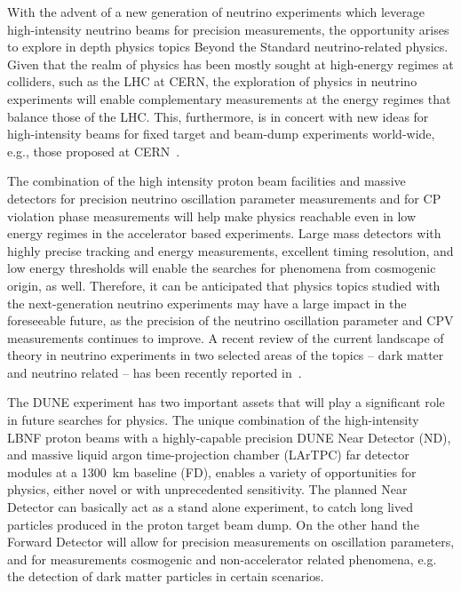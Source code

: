 
With the advent of a new generation of neutrino experiments which leverage high-intensity neutrino beams for precision measurements, 
the opportunity arises to explore in depth physics topics Beyond the Standard neutrino-related physics. 
Given that the realm of  physics  has been mostly sought at high-energy regimes at colliders, 
such as the LHC at CERN, the exploration of  physics in neutrino experiments will enable complementary 
measurements at the energy regimes that balance those  of the LHC. 
This, furthermore, is  in concert with new ideas for high-intensity beams for fixed target and beam-dump experiments 
world-wide, e.g., those proposed at CERN~\cite{Beacham:2019nyx}.

The combination of the high intensity proton beam facilities and massive detectors for precision neutrino oscillation parameter measurements and for CP violation phase measurements will help make  physics reachable even in low energy regimes in the accelerator based experiments.
Large mass detectors with highly precise tracking and energy measurements, excellent timing resolution, and low energy thresholds will enable the searches for  phenomena from cosmogenic origin, as well.
Therefore, it can be anticipated that  physics topics studied with the next-generation neutrino 
experiments may have a large impact in the foreseeable future, 
as the precision of the neutrino oscillation parameter and CPV measurements continues to improve.
A recent review of the current landscape of  theory in neutrino experiments in two selected areas of the  topics -- dark matter and neutrino related  -- has been recently reported in~\cite{Arguelles:2019xgp}.

The DUNE experiment has two important assets that will play a significant role in 
future searches for  physics.
The unique combination of the high-intensity LBNF proton beams with a highly-capable precision
 DUNE Near Detector (ND), and massive liquid argon time-projection chamber (LArTPC) far detector modules at a \SI{1300}{\km} baseline (FD), enables a variety of opportunities for  physics, either novel or with unprecedented sensitivity.
The planned Near Detector can basically act as a stand alone experiment,
to catch long lived particles produced in the proton target beam dump. On the other hand the Forward Detector
will allow for precision measurements on oscillation parameters, and for measurements cosmogenic and
 non-accelerator related phenomena, e.g. the detection of dark matter particles in certain scenarios.

